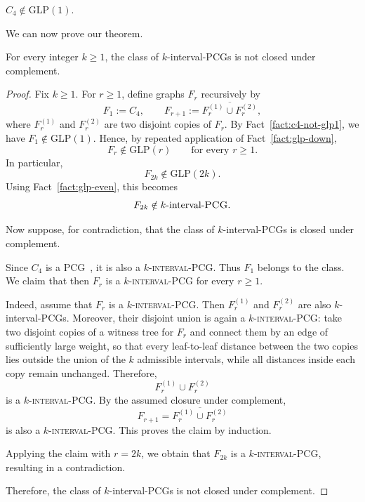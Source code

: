 \documentclass[a4paper,UKenglish,cleveref,autoref,thm-restate]{socg-lipics-v2021}
\begin{document}
\begin{proposition}\label{fact:c4-not-glp1}
\cite{la2026recognizing}
\(
C_4 \notin \mathrm{GLP}(1).
\)
\end{proposition}

We can now prove our theorem. 

\begin{theorem}
For every integer \(k \ge 1\), the class of \(k\)-interval-\textsc{PCG}s is not closed
under complement.
\end{theorem}

\begin{proof}
Fix \(k \ge 1\). For \(r \ge 1\), define graphs \(F_r\) recursively by
\[
F_1 := C_4,
\qquad
F_{r+1} := \overline{F_r^{(1)} \cup F_r^{(2)}},
\]
where \(F_r^{(1)}\) and \(F_r^{(2)}\) are two disjoint copies of \(F_r\). By Fact~\ref{fact:c4-not-glp1}, we have \(F_1 \notin \mathrm{GLP}(1)\). Hence,
by repeated application of Fact~\ref{fact:glp-down},
\[
F_r \notin \mathrm{GLP}(r)
\qquad\text{for every } r \ge 1.
\]
In particular,
\[
F_{2k} \notin \mathrm{GLP}(2k).
\]
Using Fact~\ref{fact:glp-even}, this becomes
\[
F_{2k} \notin k\text{-interval-}\textsc{PCG}.
\]

Now suppose, for contradiction, that the class of \(k\)-interval-\textsc{PCG}s is
closed under complement.

Since \(C_4\) is a \textsc{PCG}~\cite{Calamoneri2012AllGWN}, it is also a
$k$\textsc{-interval-\textsc{PCG}}. Thus \(F_1\) belongs to the class.
We claim that then \(F_r\) is a $k$\textsc{-interval-\textsc{PCG}} for every \(r \ge 1\).

Indeed, assume that \(F_r\) is a $k$\textsc{-interval-\textsc{PCG}}.
Then \(F_r^{(1)}\) and \(F_r^{(2)}\) are also \(k\)-interval-\textsc{PCG}s.
Moreover, their disjoint union is again a $k$\textsc{-interval-\textsc{PCG}}: take two
disjoint copies of a witness tree for \(F_r\) and connect them by an edge of
sufficiently large weight, so that every leaf-to-leaf distance between the two copies
lies outside the union of the \(k\) admissible intervals, while all distances inside
each copy remain unchanged. Therefore,
\[
F_r^{(1)} \cup F_r^{(2)}
\]
is a $k$\textsc{-interval-\textsc{PCG}}. By the assumed closure under complement,
\[
F_{r+1}=\overline{F_r^{(1)} \cup F_r^{(2)}}
\]
is also a $k$\textsc{-interval-\textsc{PCG}}. This proves the claim by induction.

Applying the claim with \(r=2k\), we obtain that \(F_{2k}\) is a
$k$\textsc{-interval-\textsc{PCG}}, resulting in a contradiction.

Therefore, the class of \(k\)-interval-\textsc{PCG}s is not closed under complement.
\end{proof}
\end{document}
